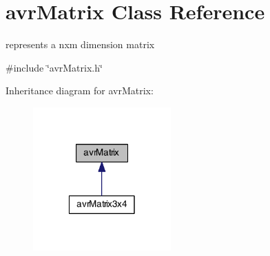 \hypertarget{classavr_matrix}{\section{avr\-Matrix Class Reference}
\label{classavr_matrix}
}


represents a nxm dimension matrix  




{\ttfamily \#include \char`\"{}avr\-Matrix.\-h\char`\"{}}



Inheritance diagram for avr\-Matrix\-:\nopagebreak
\begin{figure}[H]
\begin{center}
\leavevmode
\includegraphics[width=150pt]{classavr_matrix__inherit__graph}
\end{center}
\end{figure}

